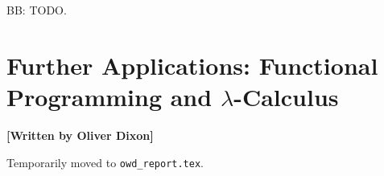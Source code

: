 \documentclass[10pt,a4paper,reqno]{amsart}
\numberwithin{figure}{section}
\begin{document}
\noindent BB: TODO.

\section{Further Applications: %
        Functional Programming and \texorpdfstring{$\lambda$}{Lambda}-Calculus}
\begin{flushright}
        \textbf{[Written by Oliver Dixon]}
\end{flushright}

\noindent Temporarily moved to \texttt{owd\_report.tex}.

\printbibliography[title=Cited Works]
\end{document}
